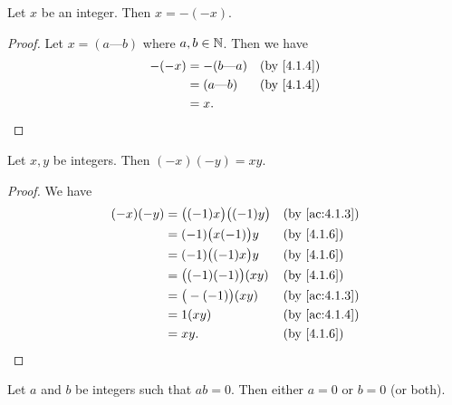 \begin{ac}\label{ac:4.1.4}
  Let \(x\) be an integer.
  Then \(x = -(-x)\).
\end{ac}

\begin{proof}
  Let \(x = (a \text{---} b)\) where \(a, b \in \mathbb{N}\).
  Then we have
  \begin{align*}
    -(-x) & = -(b \text{---} a) &  & \by{4.1.4} \\
          & = (a \text{---} b)  &  & \by{4.1.4} \\
          & = x.
  \end{align*}
\end{proof}

\begin{ac}\label{ac:4.1.5}
  Let \(x, y\) be integers.
  Then \((-x)(-y) = xy\).
\end{ac}

\begin{proof}
  We have
  \begin{align*}
    (-x)(-y) & = \big((-1)x\big) \big((-1)y\big) &  & \by{ac:4.1.3} \\
             & = (-1)\big(x(-1)\big)y            &  & \by{4.1.6}    \\
             & = (-1)\big((-1)x\big)y            &  & \by{4.1.6}    \\
             & = \big((-1)(-1)\big)(xy)          &  & \by{4.1.6}    \\
             & = \big(-(-1)\big)(xy)             &  & \by{ac:4.1.3} \\
             & = 1(xy)                           &  & \by{ac:4.1.4} \\
             & = xy.                             &  & \by{4.1.6}
  \end{align*}
\end{proof}

\begin{prop}\label{4.1.8}
  Let \(a\) and \(b\) be integers such that \(ab = 0\).
  Then either \(a = 0\) or \(b = 0\) (or both).
\end{prop}

